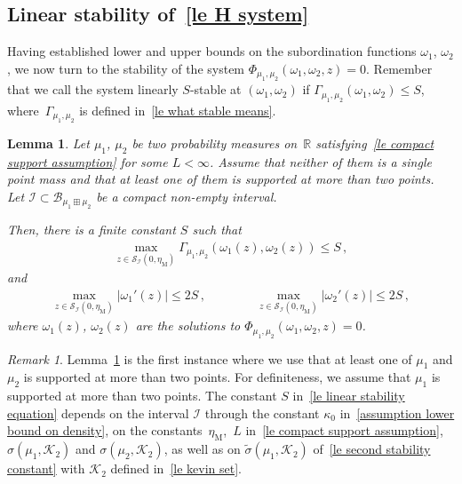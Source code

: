 \documentclass[10pt,reqno]{amsart}
\numberwithin{equation}{section}
\theoremstyle{plain}
\newtheorem{lemma}[theorem]{Lemma}
\newcounter{kevin}
\numberwithin{kevin}{section}
\theoremstyle{remark}
\newtheorem{remark}[kevin]{Remark}
\newcommand{\R}{{\mathbb R }}
\newcommand{\PP}{\Phi}
\begin{document}
\subsection{Linear stability of~\eqref{le H system}}
Having established lower and upper bounds on the subordination functions $\omega_1$, $\omega_2$, we now turn to the stability of the system $\PP_{\mu_1,\mu_2}(\omega_1,\omega_2,z)=0$. Remember that we call the system linearly $S$-stable at $(\omega_1,\omega_2)$ if $\Gamma_{\mu_1,\mu_2}(\omega_1,\omega_2)\le S$, where~$\Gamma_{\mu_1,\mu_2}$ is defined in~\eqref{le what stable means}.

\begin{lemma}\label{lemma linear stability}
Let $\mu_1$, $\mu_2$ be two probability measures on~$\R$ satisfying~\eqref{le compact support assumption} for some $L<\infty$. Assume that neither of them is a single point mass and that at least one of them is supported at more than two points. Let $\mathcal{I}\subset \mathcal{B}_{\mu_1\boxplus\mu_2}$ be a compact non-empty interval.

Then, there is a finite constant $S$ such that
\begin{align}\label{le linear stability equation}
\max_{z\in\mathcal{S}_{\mathcal{I}}(0,\eta_{\mathrm{M}})}\Gamma_{\mu_1,\mu_2}(\omega_1(z),\omega_2(z))\le S\,,
\end{align}
and 
\begin{align}\label{le control of omega derivata}
\max_{z\in\mathcal{S}_{\mathcal{I}}(0,\eta_{\mathrm{M}})}|\omega_1'(z)|\le 2S\,,\qquad\qquad \max_{z\in\mathcal{S}_{\mathcal{I}}(0,\eta_{\mathrm{M}})}|\omega_2'(z)|\le 2S\,,
\end{align}
where $\omega_1(z)$, $\omega_2(z)$ are the solutions to $\PP_{\mu_1,\mu_2}(\omega_1,\omega_2,z)=0$.
\end{lemma}
\begin{remark}
Lemma~\ref{lemma linear stability} is the first instance where we use that at least one of $\mu_1$ and $\mu_2$ is supported at more than two points.  For definiteness, we assume that $\mu_1$ is supported at more than two points. The constant $S$ in~\eqref{le linear stability equation} depends on the interval $\mathcal{I}$ through the constant $\kappa_0$ in~\eqref{assumption lower bound on density}, on the constants~$\eta_{\mathrm{M}}$,~$L$ in~\eqref{le compact support assumption},~$\sigma(\mu_1,\mathcal{K}_2)$ and $\sigma(\mu_2,\mathcal{K}_2)$, as well as on $\widetilde\sigma(\mu_1,\mathcal{K}_2)$ of~\eqref{le second stability constant} with $\mathcal{K}_2$ defined in~\eqref{le kevin set}.
\end{remark}
\end{document}
